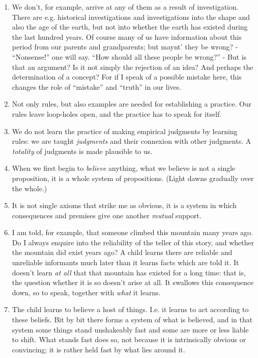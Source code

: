 \documentclass{book}
\begin{document}
\begin{enumerate}
\item
We don't, for example, arrive at any of them as a result of investigation.
There are e.g. historical investigations and investigations into the shape and
also the age of the earth, but not into whether the earth has existed during
the last hundred years. Of course many of us have information about this period
from our parents and grandparents; but maynt' they be wrong? - ``Nonsense!''
one will say. ``How should all these people be wrong?'' - But is that an
argument? Is it not simply the rejection of an idea? And perhaps the
determination of a concept? For if I speak of a possible mistake here, this
changes the role of ``mistake'' and ``truth'' in our lives.

\item
Not only rules, but also examples are needed for establishing a practice. Our
rules leave loop-holes open, and the practice has to speak for itself.

\item
We do not learn the practice of making empirical judgments by learning rules:
we are taught \emph{judgments} and their connexion with other judgments. A
\emph{totality} of judgments is made plausible to us.

\item
When we first begin to \emph{believe} anything, what we believe is not a single
proposition, it is a whole system of propositions. (Light dawns gradually over
the whole.)

\item
It is not single axioms that strike me as obvious, it is a system in which
consequences and premises give one another \emph{mutual} support.

\item
I am told, for example, that someone climbed this mountain many years ago. Do I
always enquire into the reliability of the teller of this story, and whether
the mountain did exist years ago? A child learns there are reliable and
unreliable informants much later than it learns facts which are told it. It
doesn't learn \emph{at all} that that mountain has existed for a long time:
that is, the question whether it is so doesn't arise at all. It swallows this
consequence down, so to speak, together with \emph{what} it learns.

\item
The child learns to believe a host of things. I.e. it learns to act according
to these beliefs. Bit by bit there forms a system of what is believed, and in
that system some things stand unshakeably fast and some are more or less liable
to shift. What stands fast does so, not because it is intrinsically obvious or
convincing; it is rather held fast by what lies around it.


\end{enumerate}
\end{document}
